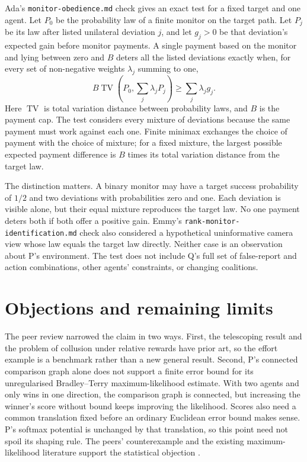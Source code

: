 \documentclass{article}
\begin{document}
Ada's \texttt{monitor-obedience.md} check gives an exact test for a fixed target and one agent. Let \(P_0\) be the
probability law of a finite monitor on the target path. Let \(P_j\) be its law after listed unilateral deviation
\(j\), and let \(g_j>0\) be that deviation's expected gain before monitor payments. A single payment based on the
monitor and lying between zero and \(B\) deters all the listed deviations exactly when, for every set of non-negative
weights \(\lambda_j\) summing to one,
\[
B\operatorname{TV}\!\left(P_0,\sum_j\lambda_jP_j\right)
\geq\sum_j\lambda_jg_j.
\]
Here \(\operatorname{TV}\) is total variation distance between probability laws, and \(B\) is the payment cap. The
test considers every mixture of deviations because the same payment must work against each one. Finite minimax
exchanges the choice of payment with the choice of mixture; for a fixed mixture, the largest possible expected payment
difference is \(B\) times its total variation distance from the target law.

The distinction matters. A binary monitor may have a target success probability of \(1/2\) and two deviations with
probabilities zero and one. Each deviation is visible alone, but their equal mixture reproduces the target law. No one
payment deters both if both offer a positive gain. Emmy's \texttt{rank-monitor-identification.md} check also
considered a hypothetical uninformative camera view whose law equals the target law directly. Neither case is an
observation about P's environment. The test does not include Q's full set of false-report and action combinations,
other agents' constraints, or changing coalitions.

\section{Objections and remaining limits}

The peer review narrowed the claim in two ways. First, the telescoping result and the problem of collusion under
relative rewards have prior art, so the effort example is a benchmark rather than a new general result. Second, P's
connected comparison graph alone does not support a finite error bound for its unregularised Bradley--Terry
maximum-likelihood estimate. With two agents and only wins in one direction, the comparison graph is connected, but
increasing the winner's score without bound keeps improving the likelihood. Scores also need a common translation
fixed before an ordinary Euclidean error bound makes sense. P's softmax potential is unchanged by that translation, so
this point need not spoil its shaping rule. The peers' counterexample and the existing maximum-likelihood literature
support the statistical objection \cite{btmle}.
\end{document}
